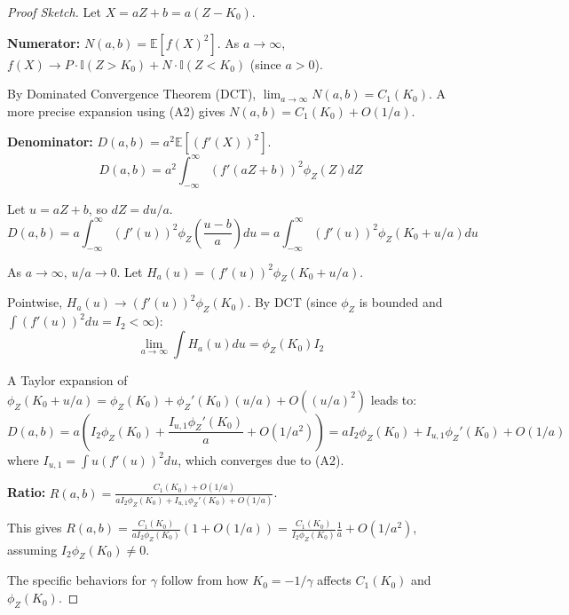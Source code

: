 \documentclass[11pt]{article}
\begin{document}
\begin{proof}[Proof Sketch]
Let $X = aZ+b = a(Z-K_0)$.

\textbf{Numerator:} $N(a,b) = \mathbb{E}[f(X)^2]$. As $a \to \infty$, $f(X) \to P \cdot \mathbb{I}(Z>K_0) + N \cdot \mathbb{I}(Z<K_0)$ (since $a>0$).

By Dominated Convergence Theorem (DCT), $\lim_{a\to\infty} N(a,b) = C_1(K_0)$.
A more precise expansion using (A2) gives $N(a,b) = C_1(K_0) + O(1/a)$.

\textbf{Denominator:} $D(a,b) = a^2 \mathbb{E}[(f'(X))^2]$.
$$D(a,b) = a^2 \int_{-\infty}^{\infty} (f'(aZ+b))^2 \phi_Z(Z)dZ$$

Let $u=aZ+b$, so $dZ=du/a$.
$$D(a,b) = a \int_{-\infty}^{\infty} (f'(u))^2 \phi_Z\left(\frac{u-b}{a}\right)du = a \int_{-\infty}^{\infty} (f'(u))^2 \phi_Z\left(K_0 + u/a\right)du$$

As $a \to \infty$, $u/a \to 0$. Let $H_a(u) = (f'(u))^2 \phi_Z(K_0 + u/a)$.

Pointwise, $H_a(u) \to (f'(u))^2 \phi_Z(K_0)$. By DCT (since $\phi_Z$ is bounded and $\int (f'(u))^2 du = I_2 < \infty$):
$$\lim_{a\to\infty} \int H_a(u)du = \phi_Z(K_0)I_2$$

A Taylor expansion of $\phi_Z(K_0+u/a) = \phi_Z(K_0) + \phi_Z'(K_0)(u/a) + O((u/a)^2)$ leads to:
$$D(a,b) = a \left( I_2\phi_Z(K_0) + \frac{I_{u,1}\phi_Z'(K_0)}{a} + O(1/a^2) \right) = aI_2\phi_Z(K_0) + I_{u,1}\phi_Z'(K_0) + O(1/a)$$
where $I_{u,1} = \int u(f'(u))^2 du$, which converges due to (A2).

\textbf{Ratio:} $R(a,b) = \frac{C_1(K_0) + O(1/a)}{aI_2\phi_Z(K_0) + I_{u,1}\phi_Z'(K_0) + O(1/a)}$.

This gives $R(a,b) = \frac{C_1(K_0)}{aI_2\phi_Z(K_0)} (1 + O(1/a)) = \frac{C_1(K_0)}{I_2\phi_Z(K_0)} \frac{1}{a} + O(1/a^2)$, assuming $I_2\phi_Z(K_0) \neq 0$. 

The specific behaviors for $\gamma$ follow from how $K_0=-1/\gamma$ affects $C_1(K_0)$ and $\phi_Z(K_0)$.
\end{proof}
\end{document}
